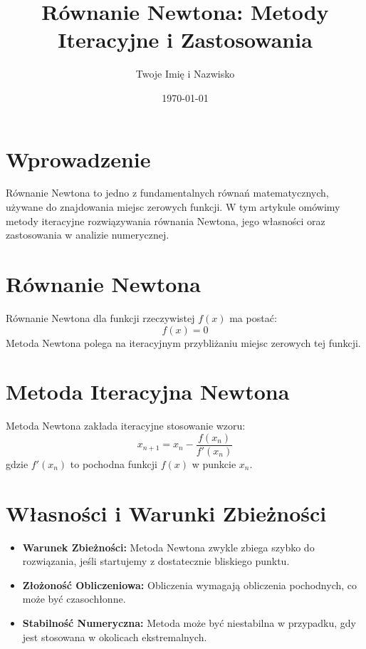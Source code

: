 \documentclass[12pt]{article}
\title{Równanie Newtona: Metody Iteracyjne i Zastosowania}
\author{Twoje Imię i Nazwisko}
\date{\today}
\begin{document}
\maketitle

\section{Wprowadzenie}
Równanie Newtona to jedno z fundamentalnych równań matematycznych, używane do znajdowania miejsc zerowych funkcji. W tym artykule omówimy metody iteracyjne rozwiązywania równania Newtona, jego własności oraz zastosowania w analizie numerycznej.

\section{Równanie Newtona}
\begin{definition}
Równanie Newtona dla funkcji rzeczywistej $f(x)$ ma postać:
\[
f(x) = 0
\]
Metoda Newtona polega na iteracyjnym przybliżaniu miejsc zerowych tej funkcji.
\end{definition}

\section{Metoda Iteracyjna Newtona}
\begin{theorem}
Metoda Newtona zakłada iteracyjne stosowanie wzoru:
\[
x_{n+1} = x_n - \frac{f(x_n)}{f'(x_n)}
\]
gdzie $f'(x_n)$ to pochodna funkcji $f(x)$ w punkcie $x_n$.
\end{theorem}

\section{Własności i Warunki Zbieżności}
\begin{itemize}
  \item \textbf{Warunek Zbieżności:} Metoda Newtona zwykle zbiega szybko do rozwiązania, jeśli startujemy z dostatecznie bliskiego punktu.
  
  \item \textbf{Złożoność Obliczeniowa:} Obliczenia wymagają obliczenia pochodnych, co może być czasochłonne.
  
  \item \textbf{Stabilność Numeryczna:} Metoda może być niestabilna w przypadku, gdy jest stosowana w okolicach ekstremalnych.
\end{itemize}
\end{document}
